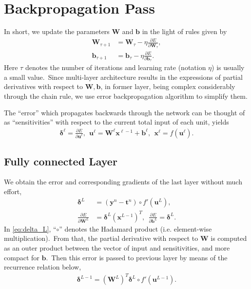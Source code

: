 \section{Backpropagation Pass}
In short, we update the parameters $\bm{W}$ and $\bm{b}$ in the light of rules given by
\begin{align}
	\bm{W}_{\tau+1} &= \bm{W}_\tau - \eta \frac{\partial E}{\partial \bm{W}_\tau}, \\
	\bm{b}_{\tau+1} &= \bm{b}_\tau - \eta \frac{\partial E}{\partial \bm{b}_\tau}.
\end{align}
Here $\tau$ denotes the number of iterations and learning rate (notation $\eta$) is usually a small value.~Since multi-layer architecture results in the expressions of partial derivatives with respect to $\bm{W},\bm{b}$, in former layer, being complex considerably through the chain rule, we use error backpropagation algorithm to simplify them.

The ``error'' which propagates backwards through the network can be thought of as ``sensitivities'' with respect to the current total input of each unit, yields
\begin{align}
	\bm{\delta}^\ell = \frac{\partial E}{\partial \bm{u}^\ell}, ~~ \bm{u}^\ell = \bm{W}^\ell \bm{x}^{\ell - 1} + \bm{b}^\ell, ~~ \bm{x}^\ell = f(\bm{u}^\ell).
\end{align}

\subsection{Fully connected Layer}
We obtain the error and corresponding gradients of the last layer without much effort,
\begin{align}
	\bm{\delta}^L &= (\bm{y}^n - \bm{t}^n) \circ f'(\bm{u}^L), \label{eq:delta_L}\\
	\frac{\partial E}{\partial \bm{W}^L} &= \bm{\delta}^L (\bm{x}^{L-1})^T, ~~ \frac{\partial E}{\partial \bm{b}^L} = \bm{\delta}^L.
\end{align}
In \eqref{eq:delta_L}, ``$\circ$'' denotes the Hadamard product (i.e. element-wise multiplication).~From that, the partial derivative with respect to $\bm{W}$ is computed as an outer product between the vector of input and sensitivities, and more compact for $\bm{b}$.~Then this error is passed to previous layer by means of the recurrence relation below, 
\begin{align}
	\bm{\delta}^{L-1} = (\bm{W}^L)^T \bm{\delta}^L \circ f'(\bm{u}^{L-1}). \label{eq:recursion}
\end{align}

